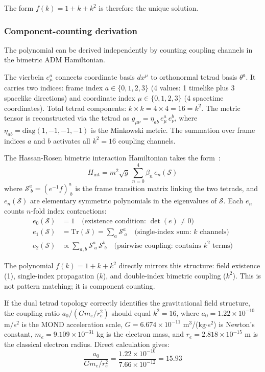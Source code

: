 \documentclass[aps,prd,preprint,superscriptaddress,showpacs,preprintnumbers,amsmath,amssymb,nofootinbib]{revtex4-2}
\begin{document}
The form $f(k) = 1 + k + k^2$ is therefore the unique solution.

\subsubsection*{Component-counting derivation}

The polynomial can be derived independently by counting coupling channels in the bimetric ADM Hamiltonian.

The vierbein $e^a_{\mu}$ connects coordinate basis $dx^{\mu}$ to orthonormal tetrad basis $\theta^a$. It carries two indices: frame index $a \in \{0,1,2,3\}$ (4 values: 1 timelike plus 3 spacelike directions) and coordinate index $\mu \in \{0,1,2,3\}$ (4 spacetime coordinates). Total tetrad components: $k \times k = 4 \times 4 = 16 = k^2$. The metric tensor is reconstructed via the tetrad as $g_{\mu\nu} = \eta_{ab}\, e^a_{\mu}\, e^b_{\nu}$, where $\eta_{ab} = \mathrm{diag}(1,-1,-1,-1)$ is the Minkowski metric. The summation over frame indices $a$ and $b$ activates all $k^2 = 16$ coupling channels.

The Hassan-Rosen bimetric interaction Hamiltonian takes the form~\cite{hassan2012}:
\begin{equation}
H_{\mathrm{int}} = m^2 \sqrt{g}\, \sum_{n=0}^{4} \beta_n\, e_n(\mathcal{S})
\end{equation}
where $\mathcal{S}^a_{\;b} = (e^{-1}f)^a_{\;b}$ is the frame transition matrix linking the two tetrads, and $e_n(\mathcal{S})$ are elementary symmetric polynomials in the eigenvalues of $\mathcal{S}$. Each $e_n$ counts $n$-fold index contractions:
\begin{align}
e_0(\mathcal{S}) &= 1 \quad \text{(existence condition: $\det(e) \neq 0$)} \\
e_1(\mathcal{S}) &= \mathrm{Tr}(\mathcal{S}) = \sum_a \mathcal{S}^a_{\;a} \quad \text{(single-index sum: $k$ channels)} \\
e_2(\mathcal{S}) &\propto \sum_{a,b} \mathcal{S}^a_{\;a}\, \mathcal{S}^b_{\;b} \quad \text{(pairwise coupling: contains $k^2$ terms)}
\end{align}

The polynomial $f(k) = 1 + k + k^2$ directly mirrors this structure: field existence (1), single-index propagation ($k$), and double-index bimetric coupling ($k^2$). This is not pattern matching; it is component counting.

If the dual tetrad topology correctly identifies the gravitational field structure, the coupling ratio $a_0 / (G m_e / r_e^2)$ should equal $k^2 = 16$, where $a_0 = 1.22 \times 10^{-10}$ m/s$^2$ is the MOND acceleration scale, $G = 6.674 \times 10^{-11}$ m$^3$/(kg$\cdot$s$^2$) is Newton's constant, $m_e = 9.109 \times 10^{-31}$ kg is the electron mass, and $r_e = 2.818 \times 10^{-15}$ m is the classical electron radius. Direct calculation gives:
\begin{equation}
\frac{a_0}{G m_e / r_e^2} = \frac{1.22 \times 10^{-10}}{7.66 \times 10^{-12}} = 15.93
\end{equation}
\end{document}
